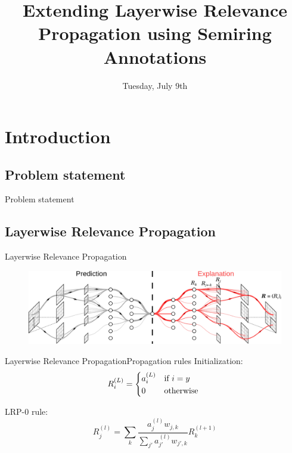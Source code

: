 \documentclass[aspectratio=169]{beamer}
\title{\textbf{Extending Layerwise Relevance Propagation using Semiring Annotations}}
\author{%
  \texorpdfstring{%
    \begin{columns}
      \column{.5\linewidth}
      \centering
      \textbf{Antoine Groudiev} \\ L3, ENS Ulm
      \column{.5\linewidth}
      \centering
      \textbf{Silviu Maniu} -- Supervisor \\ SLIDE Team, LIG
    \end{columns}
 }
 {Antoine Groudiev, Silviu Maniu}
}
\date{Tuesday, July 9th}
\theoremstyle{definition}
\begin{document}
\frame{\titlepage}


\section{Introduction}
\subsection{Problem statement}
\begin{frame}{Problem statement}

\end{frame}

\subsection{Layerwise Relevance Propagation}
\begin{frame}{Layerwise Relevance Propagation}
    \begin{figure}[H]
        \includegraphics[width=\textwidth]{LRP.png}
    \end{figure}
\end{frame}

\begin{frame}{Layerwise Relevance Propagation}{Propagation rules}
    Initialization:
    \begin{equation}
        R^{(L)}_i = \begin{cases*}
            a^{(L)}_i & if $i = y$\\
            0 & otherwise
        \end{cases*}
    \end{equation}

    LRP-0 rule:
    \begin{equation}
        R^{(l)}_j = \sum_{k}\frac{a^{(l)}_jw_{j, k}}{\sum_{j'}a^{(l)}_{j'}w_{j', k}} R^{(l+1)}_k
    \end{equation}
\end{frame}
\end{document}
